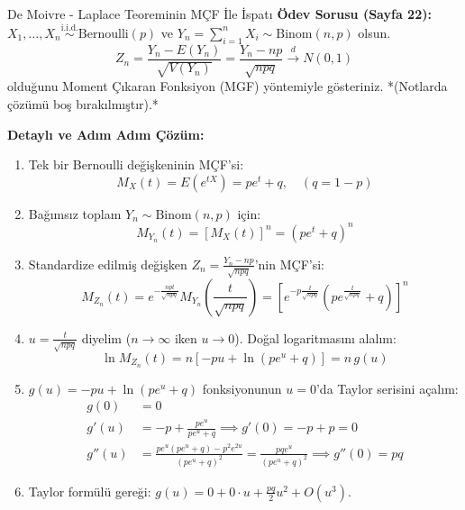 \documentclass[12pt,a4paper]{article}
\begin{document}
\begin{odev}{De Moivre - Laplace Teoreminin MÇF İle İspatı}
\textbf{Ödev Sorusu (Sayfa 22):} $X_1, \dots, X_n \overset{\text{i.i.d.}}{\sim} \text{Bernoulli}(p)$ ve $Y_n = \sum_{i=1}^n X_i \sim \text{Binom}(n, p)$ olsun.
\begin{equation}
    Z_n = \frac{Y_n - E(Y_n)}{\sqrt{V(Y_n)}} = \frac{Y_n - np}{\sqrt{npq}} \xrightarrow{d} N(0, 1)
\end{equation}
olduğunu Moment Çıkaran Fonksiyon (MGF) yöntemiyle gösteriniz. *(Notlarda çözümü boş bırakılmıştır).*

\bigskip
\textbf{Detaylı ve Adım Adım Çözüm:}
\begin{enumerate}
    \item Tek bir Bernoulli değişkeninin MÇF'si:
    \begin{equation}
        M_X(t) = E(e^{tX}) = p e^t + q, \quad (q = 1 - p)
    \end{equation}
    \item Bağımsız toplam $Y_n \sim \text{Binom}(n, p)$ için:
    \begin{equation}
        M_{Y_n}(t) = [M_X(t)]^n = (p e^t + q)^n
    \end{equation}
    \item Standardize edilmiş değişken $Z_n = \frac{Y_n - np}{\sqrt{npq}}$'nin MÇF'si:
    \begin{equation}
        M_{Z_n}(t) = e^{-\frac{npt}{\sqrt{npq}}} M_{Y_n}\left( \frac{t}{\sqrt{npq}} \right) = \left[ e^{-p \frac{t}{\sqrt{npq}}} \left( p e^{\frac{t}{\sqrt{npq}}} + q \right) \right]^n
    \end{equation}
    \item $u = \frac{t}{\sqrt{npq}}$ diyelim ($n \to \infty$ iken $u \to 0$). Doğal logaritmasını alalım:
    \begin{equation}
        \ln M_{Z_n}(t) = n \left[ -p u + \ln(p e^u + q) \right] = n \, g(u)
    \end{equation}
    \item $g(u) = -pu + \ln(pe^u + q)$ fonksiyonunun $u=0$'da Taylor serisini açalım:
    \begin{align}
        g(0) &= 0 \\
        g'(u) &= -p + \frac{p e^u}{p e^u + q} \implies g'(0) = -p + p = 0 \\
        g''(u) &= \frac{p e^u(p e^u + q) - p^2 e^{2u}}{(p e^u + q)^2} = \frac{pq e^u}{(p e^u + q)^2} \implies g''(0) = pq
    \end{align}
    \item Taylor formülü gereği: $g(u) = 0 + 0 \cdot u + \frac{pq}{2} u^2 + O(u^3)$.  

\end{enumerate}
\end{odev}
\end{document}
